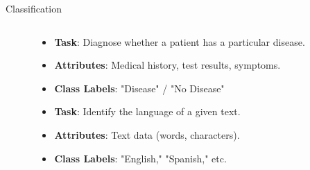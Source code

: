 \documentclass[aspectratio=169]{beamer}
\begin{document}
\begin{frame}{Classification}
\begin{columns}
\begin{column}{0.32\textwidth}
        \end{column}
        \begin{column}{0.32\textwidth}
            \begin{coloredblock}
                \begin{itemize}
                    \item \scriptsize \textbf{Task}: Diagnose whether a patient has a particular disease.
                    \item \scriptsize \textbf{Attributes}: Medical history, test results, symptoms.
                    \item \scriptsize \textbf{Class Labels}: "Disease" / "No Disease"
                \end{itemize}
            \end{coloredblock}
            \vspace{0.1cm}
            \begin{coloredblock}
                \begin{itemize}
                    \item \scriptsize \textbf{Task}: Identify the language of a given text.
                    \item \scriptsize \textbf{Attributes}: Text data (words, characters).
                    \item \scriptsize \textbf{Class Labels}: "English," "Spanish," etc.
                \end{itemize}
            \end{coloredblock}
        
        \end{column}
        \begin{column}{0.32\textwidth}
        

\end{column}
\end{columns}
\end{frame}
\end{document}
